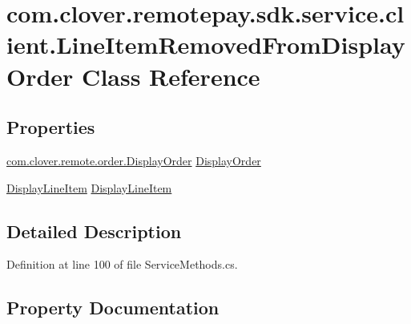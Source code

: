\hypertarget{classcom_1_1clover_1_1remotepay_1_1sdk_1_1service_1_1client_1_1_line_item_removed_from_display_order}{}\section{com.\+clover.\+remotepay.\+sdk.\+service.\+client.\+Line\+Item\+Removed\+From\+Display\+Order Class Reference}
\label{classcom_1_1clover_1_1remotepay_1_1sdk_1_1service_1_1client_1_1_line_item_removed_from_display_order}
\subsection*{Properties}
\begin{DoxyCompactItemize}
\item 
\hyperlink{classcom_1_1clover_1_1remote_1_1order_1_1_display_order}{com.\+clover.\+remote.\+order.\+Display\+Order} \hyperlink{classcom_1_1clover_1_1remotepay_1_1sdk_1_1service_1_1client_1_1_line_item_removed_from_display_order_ab9c1027976168a136c0385129994541e}{Display\+Order}
\item 
\hyperlink{classcom_1_1clover_1_1remote_1_1order_1_1_display_line_item}{Display\+Line\+Item} \hyperlink{classcom_1_1clover_1_1remotepay_1_1sdk_1_1service_1_1client_1_1_line_item_removed_from_display_order_a883dd5c939baeb0335091ebaba84d093}{Display\+Line\+Item}
\end{DoxyCompactItemize}


\subsection{Detailed Description}


Definition at line 100 of file Service\+Methods.\+cs.



\subsection{Property Documentation}
\mbox{\label{classcom_1_1clover_1_1remotepay_1_1sdk_1_1service_1_1client_1_1_line_item_removed_from_display_order_a883dd5c939baeb0335091ebaba84d093}} 
